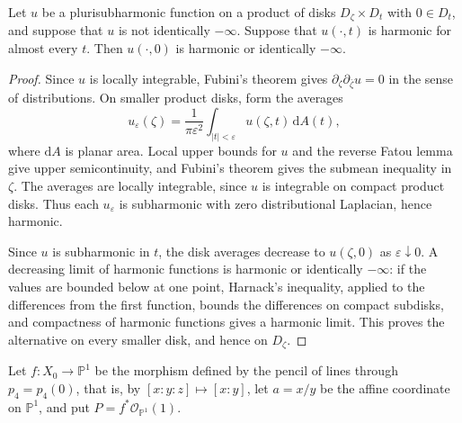 \begin{lemma}\label{lem:psh-harmonic-slice-persistence}
Let $u$ be a plurisubharmonic function on a product of disks $D_\zeta\times D_t$ with $0\in D_t$, and suppose that $u$ is not identically $-\infty$. Suppose that $u(\cdot,t)$ is harmonic for almost every $t$. Then $u(\cdot,0)$ is harmonic or identically $-\infty$.
\end{lemma}
\begin{proof}
Since $u$ is locally integrable, Fubini's theorem gives $\partial_\zeta\partial_{\bar\zeta}u=0$ in the sense of distributions. On smaller product disks, form the averages
\[
 u_\varepsilon(\zeta)=\frac1{\pi\varepsilon^2}
       \int_{|t|<\varepsilon}u(\zeta,t)\,\mathrm{d}A(t),
\]
where $\mathrm{d}A$ is planar area. Local upper bounds for $u$ and the reverse Fatou lemma give upper semicontinuity, and Fubini's theorem gives the submean inequality in $\zeta$. The averages are locally integrable, since $u$ is integrable on compact product disks. Thus each $u_\varepsilon$ is subharmonic with zero distributional Laplacian, hence harmonic.

Since $u$ is subharmonic in $t$, the disk averages decrease to $u(\zeta,0)$ as $\varepsilon\downarrow0$. A decreasing limit of harmonic functions is harmonic or identically $-\infty$: if the values are bounded below at one point, Harnack's inequality, applied to the differences from the first function, bounds the differences on compact subdisks, and compactness of harmonic functions gives a harmonic limit. This proves the alternative on every smaller disk, and hence on $D_\zeta$.
\end{proof}

Let $f\colon X_0\to\mathbb P^1$ be the morphism defined by the pencil of lines through $p_4=p_4(0)$, that is, by $[x:y:z]\mapsto[x:y]$, let $a=x/y$ be the affine coordinate on $\mathbb P^1$, and put $P=f^*\mathcal O_{\mathbb P^1}(1)$.

